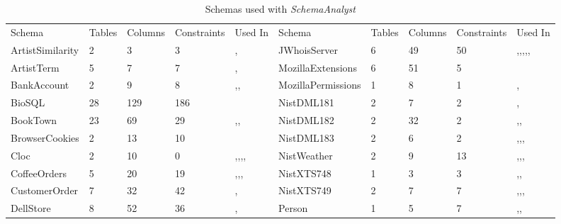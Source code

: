 \begin{table*}[t]
\scriptsize
\centering
\caption{Schemas used with \textit{SchemaAnalyst}}
\label{tab:schemas}
\begin{tabular}{llllllllll}
Schema&Tables&Columns&Constraints&Used In&Schema&Tables&Columns&Constraints&Used In \\
ArtistSimilarity&2&3&3&\cite{wright2014impact},\cite{mcminn2015effectiveness}&JWhoisServer&6&49&50&\cite{mcminn2016virtual},\cite{kapfhammer2013search},\cite{wright2013efficient},\cite{wright2014impact},\cite{mcminn2015effectiveness},\cite{kinneer2015automatically}\\
ArtistTerm&5&7&7&\cite{wright2014impact},\cite{mcminn2015effectiveness}&MozillaExtensions&6&51&5&\cite{mcminn2015effectiveness} \\
BankAccount&2&9&8&\cite{kapfhammer2013search},\cite{wright2014impact},\cite{mcminn2015effectiveness}&MozillaPermissions&1&8&1&\cite{mcminn2016virtual},\cite{mcminn2015effectiveness}\\
BioSQL&28&129&186&\cite{kinneer2015automatically}&NistDML181&2&7&2&\cite{kapfhammer2013search},\cite{mcminn2015effectiveness}  \\
BookTown&23&69&29&\cite{kapfhammer2013search},\cite{wright2014impact},\cite{mcminn2015effectiveness}&NistDML182&2&32&2&\cite{kapfhammer2013search},\cite{wright2013efficient},\cite{mcminn2015effectiveness}  \\
BrowserCookies&2&13&10&\cite{mcminn2015effectiveness}&NistDML183&2&6&2&\cite{kapfhammer2013search},\cite{wright2013efficient},\cite{wright2014impact},\cite{mcminn2015effectiveness}  \\
Cloc&2&10&0&\cite{kapfhammer2013search},\cite{wright2013efficient},\cite{wright2014impact},\cite{mcminn2015effectiveness},\cite{kinneer2015automatically}&NistWeather&2&9&13&\cite{mcminn2016virtual},\cite{kapfhammer2013search},\cite{mcminn2015effectiveness},\cite{kinneer2015automatically}\\
CoffeeOrders&5&20&19&\cite{mcminn2016virtual},\cite{kapfhammer2013search},\cite{wright2014impact},\cite{mcminn2015effectiveness}&NistXTS748&1&3&3&\cite{kapfhammer2013search},\cite{mcminn2015effectiveness},\cite{kinneer2015automatically} \\
CustomerOrder&7&32&42&\cite{kapfhammer2013search},\cite{mcminn2015effectiveness}&NistXTS749&2&7&7&\cite{kapfhammer2013search},\cite{wright2014impact},\cite{mcminn2015effectiveness},\cite{kinneer2015automatically} \\
DellStore&8&52&36&\cite{kapfhammer2013search},\cite{mcminn2015effectiveness}&Person&1&5&7&\cite{mcminn2016virtual},\cite{kapfhammer2013search},\cite{mcminn2015effectiveness}\\

\end{tabular}
\end{table*}
